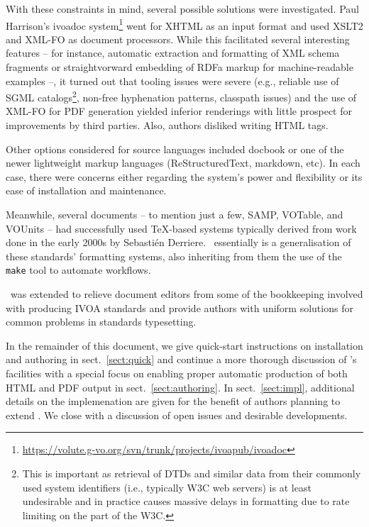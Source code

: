 \documentclass[11pt,a4paper]{ivoa}
\begin{document}
With these constraints in mind, several possible solutions were
investigated.  Paul
Harrison's ivoadoc
system\footnote{\url{https://volute.g-vo.org/svn/trunk/projects/ivoapub/ivoadoc}} 
went for XHTML as
an input format and used XSLT2 and XML-FO as document processors.  While
this facilitated several interesting features  -- for instance,
automatic extraction and formatting of XML schema fragments or
straightvorward embedding of RDFa markup for machine-readable examples
--, it turned out that tooling issues were severe (e.g., reliable use
of SGML catalogs\footnote{This is important as retrieval of DTDs and
similar data from their commonly used system identifiers (i.e.,
typically W3C web servers) is at least undesirable and in practice
causes massive delays in formatting due to rate limiting on the part of
the W3C.}, non-free hyphenation patterns, classpath issues) and the use
of XML-FO for PDF generation yielded inferior renderings with little
prospect for improvements by third parties. Also, authors disliked
writing HTML tags.

Other options considered for source languages included docbook or one of
the newer lightweight markup languages (ReStructuredText, markdown,
etc).  In each case, there were concerns either regarding the system's power
and flexibility or its ease of installation and maintenance.

Meanwhile, several documents -- to mention just a few, SAMP, VOTable,
and VOUnits -- had successfully used \TeX-based systems typically
derived from work done in the early 2000s by Sebasti\'en Derriere.
\ivoatex\ essentially is a generalisation of these standards' formatting
systems, also inheriting from them the use of the \texttt{make} tool to
automate workflows.

\ivoatex\ was extended to relieve document editors from some of the
bookkeeping involved with producing IVOA standards and provide authors
with uniform solutions for common problems in standards typesetting.

In the remainder of this document, we give quick-start instructions
on installation and authoring in sect.~\ref{sect:quick} and continue
a more thorough discussion of \ivoatex's facilities with a special focus
on enabling proper automatic production of both HTML and PDF output in
sect.~\ref{sect:authoring}.  In sect.~\ref{sect:impl}, additional
details on the implemenation are given for the benefit of authors
planning to extend \ivoatex.  We close with a discussion of open issues
and desirable developments.
\end{document}
